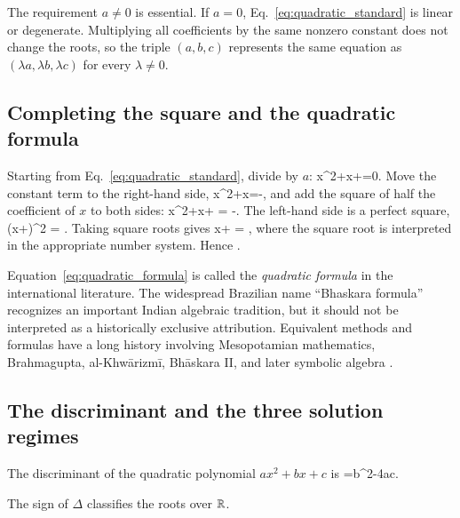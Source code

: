 The requirement $a\neq0$ is essential. If $a=0$, Eq.~\eqref{eq:quadratic_standard} is linear or degenerate. Multiplying all coefficients by the same nonzero constant does not change the roots, so the triple $(a,b,c)$ represents the same equation as $(\lambda a,\lambda b,\lambda c)$ for every $\lambda\neq0$.

\subsection{Completing the square and the quadratic formula}
\label{sec:quadratic_formula}

Starting from Eq.~\eqref{eq:quadratic_standard}, divide by $a$:
\be
x^2+x+=0.
\ee
Move the constant term to the right-hand side,
\be
x^2+x=-,
\ee
and add the square of half the coefficient of $x$ to both sides:
\be
x^2+x+
=
-.
\ee
The left-hand side is a perfect square,
\be
\left(x+\right)^2
=
.
\ee
Taking square roots gives
\be
x+
=
\pm{},
\ee
where the square root is interpreted in the appropriate number system. Hence
\be
{}.
\ee

\begin{remark}
Equation~\eqref{eq:quadratic_formula} is called the \emph{quadratic formula} in the international literature. The widespread Brazilian name ``Bhaskara formula'' recognizes an important Indian algebraic tradition, but it should not be interpreted as a historically exclusive attribution. Equivalent methods and formulas have a long history involving Mesopotamian mathematics, Brahmagupta, al-Khw\={a}rizm\={i}, Bh\={a}skara II, and later symbolic algebra \cite{katz2009,plofker2009,boyer2011}.
\end{remark}

\subsection{The discriminant and the three solution regimes}

\begin{definition}[Discriminant]
The discriminant of the quadratic polynomial $ax^2+bx+c$ is
\be
\Delta=b^2-4ac.
\ee
\end{definition}

The sign of $\Delta$ classifies the roots over $\mathbb{R}$.

